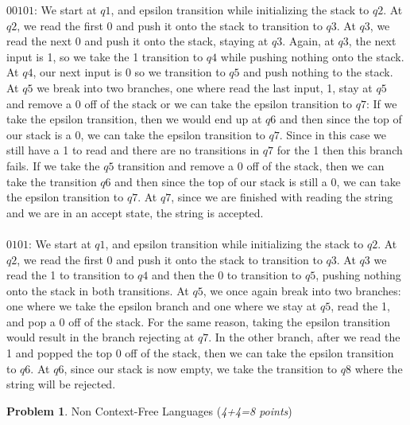 \documentclass[11pt]{article}
\theoremstyle{definition}
\theoremstyle{theorem}
\newtheorem{prob}{Problem}
\begin{document}
$00101$: We start at $q1$, and epsilon transition while initializing the stack to $q2$. At $q2$, we read the first 0 and push it onto the stack to transition to $q3$. At $q3$, we read the next 0 and push it onto the stack, staying at $q3$. Again, at $q3$, the next input is 1, so we take the 1 transition to $q4$ while pushing nothing onto the stack. At $q4$, our next input is 0 so we transition to $q5$ and push nothing to the stack.
At $q5$ we break into two branches, one where read the last input, 1, stay at $q5$ and remove a 0 off of the stack or we can take the epsilon transition to $q7$: 
If we take the epsilon transition, then we would end up at $q6$ and then since the top of our stack is a 0, we can take the epsilon transition to $q7$. Since in this case we still have a 1 to read and there are no transitions in $q7$ for the 1 then this branch fails.
If we take the $q5$ transition and remove a 0 off of the stack, then we can take the transition $q6$ and then since the top of our stack is still a 0, we can take the epsilon transition to $q7$. At $q7$, since we are finished with reading the string and we are in an accept state, the string is accepted. \\~\\

$0101$: We start at $q1$, and epsilon transition while initializing the stack to $q2$. At $q2$, we read the first 0 and push it onto the stack to transition to $q3$. At $q3$ we read the 1 to transition to $q4$ and then the 0 to transition to $q5$, pushing nothing onto the stack in both transitions.
At $q5$, we once again break into two branches: one where we take the epsilon branch and one where we stay at $q5$, read the 1, and pop a 0 off of the stack. For the same reason, taking the epsilon transition would result in the branch rejecting at $q7$. In the other branch, after we read the 1 and popped the top 0 off of the stack, then we can take the epsilon transition to $q6$. At $q6$, since our stack is now empty, we take the transition to $q8$ where the string will be rejected.









\newpage

\begin{prob} Non Context-Free Languages (\emph{4+4=8 points})\end{prob}
\end{document}
